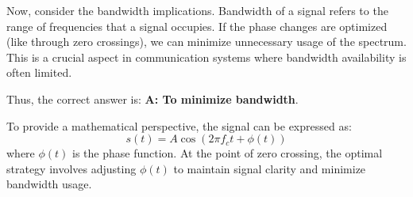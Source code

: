 Now, consider the bandwidth implications. Bandwidth of a signal refers to the range of frequencies that a signal occupies. If the phase changes are optimized (like through zero crossings), we can minimize unnecessary usage of the spectrum. This is a crucial aspect in communication systems where bandwidth availability is often limited.

Thus, the correct answer is: \textbf{A: To minimize bandwidth}. 

To provide a mathematical perspective, the signal can be expressed as:
\[
s(t) = A \cos(2\pi f_c t + \phi(t))
\]
where \(\phi(t)\) is the phase function. At the point of zero crossing, the optimal strategy involves adjusting \(\phi(t)\) to maintain signal clarity and minimize bandwidth usage. 

\begin{comment}
\end{comment}